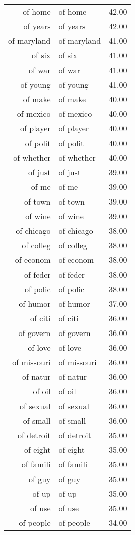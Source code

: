 \begin{table}[ht]
\begin{tabular}{rlr}
  of home & of home & 42.00 \\ 
  of years & of years & 42.00 \\ 
  of maryland & of maryland & 41.00 \\ 
  of six & of six & 41.00 \\ 
  of war & of war & 41.00 \\ 
  of young & of young & 41.00 \\ 
  of make & of make & 40.00 \\ 
  of mexico & of mexico & 40.00 \\ 
  of player & of player & 40.00 \\ 
  of polit & of polit & 40.00 \\ 
  of whether & of whether & 40.00 \\ 
  of just & of just & 39.00 \\ 
  of me & of me & 39.00 \\ 
  of town & of town & 39.00 \\ 
  of wine & of wine & 39.00 \\ 
  of chicago & of chicago & 38.00 \\ 
  of colleg & of colleg & 38.00 \\ 
  of econom & of econom & 38.00 \\ 
  of feder & of feder & 38.00 \\ 
  of polic & of polic & 38.00 \\ 
  of humor & of humor & 37.00 \\ 
  of citi & of citi & 36.00 \\ 
  of govern & of govern & 36.00 \\ 
  of love & of love & 36.00 \\ 
  of missouri & of missouri & 36.00 \\ 
  of natur & of natur & 36.00 \\ 
  of oil & of oil & 36.00 \\ 
  of sexual & of sexual & 36.00 \\ 
  of small & of small & 36.00 \\ 
  of detroit & of detroit & 35.00 \\ 
  of eight & of eight & 35.00 \\ 
  of famili & of famili & 35.00 \\ 
  of guy & of guy & 35.00 \\ 
  of up & of up & 35.00 \\ 
  of use & of use & 35.00 \\ 
  of people & of people & 34.00 \\ 

\end{tabular}
\end{table}
